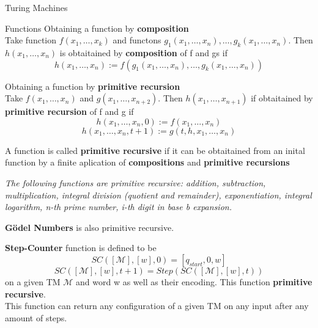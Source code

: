 \documentclass[12pt, letterpaper]{article}
\begin{document}
\begin{section}{Turing Machines}
\begin{subsection}{Functions}
    Obtaining a function by \textbf{composition} \\
    Take function \(f(x_{1}, \dots, x_{k})\) and functons
    \(g_{1}(x_{1}, \dots, x_{n}), \dots, g_{k}(x_{1}, \dots, x_{n})\).
    Then \(h(x_{1}, \dots, x_{n})\) is obtaitained by \textbf{composition}
    of f and gs if
    \[h(x_{1}, \dots, x_{n}) := f(g_{1}(x_{1}, \dots, x_{n}), \dots, g_{k}(x_{1}, \dots, x_{n}))\]

    Obtaining a function by \textbf{primitive recursion} \\
    Take \(f(x_{1}, \dots, x_{n})\) and \(g(x_{1}, \dots, x_{n+2})\). Then
    \(h(x_{1}, \dots, x_{n + 1})\) if obtaitained by \textbf{primitive recursion}
    of f and g if
    \[h(x_{1}, \dots, x_{n}, 0) := f(x_{1}, \dots, x_{n})\]
    \[h(x_{1}, \dots, x_{n}, t + 1) := g(t, h, x_{1}, \dots, x_{n})\]

    A function is called \textbf{primitive recursive} if it can be obtaitained
    from an inital function by a finite aplication of
    \textbf{compositions} and \textbf{primitive recursions}

    \textit{The following functions are primitive recursive:
      addition, subtraction, multiplication, integral division
      (quotient and remainder), exponentiation, integral logarithm,
      n-th prime number, i-th digit in base b expansion.}

    \textbf{Gödel Numbers} is also primitive recursive.

    \textbf{Step-Counter} function is defined to be
    \[SC([\mathscr{M}], [w], 0) = [q_{start}, 0, w]\]
    \[SC([\mathscr{M}], [w], t + 1) = Step(SC([\mathscr{M}], [w], t))\]
    on a given TM \(\mathscr{M}\) and word w as well as their encoding.
    This function \textbf{primitive recursive}. \\
    This function can return any configuration of a given TM on any input
    after any amount of steps.
  \end{subsection}

\end{section}
\end{document}
